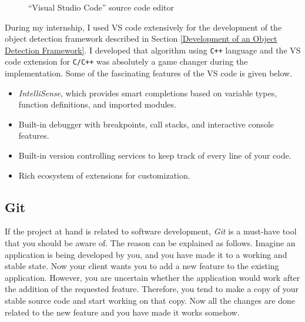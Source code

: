 \documentclass[a4paper,12pt]{report}
\begin{document}
\begin{figure}[H]
	\centering
	\caption{``Visual Studio Code'' source code editor}
	\label{fig:vscode}
\end{figure}

During my internship, I used VS code extensively for the development of the object detection framework described in Section \ref{Development of an Object Detection Framework}. I developed that algorithm using {\tt C++} language and the VS code extension for {\tt C/C++} was absolutely a game changer during the implementation. Some of the fascinating features of the VS code is given below\cite{vscode}.

\begin{itemize}
	\item \textit{IntelliSense}, which provides smart completions based on variable types, function definitions, and imported modules.
	
	\item Built-in debugger with breakpoints, call stacks, and interactive console features.
	
	\item Built-in version controlling services to keep track of every line of your code.
	
	\item Rich ecosystem of extensions for customization.
\end{itemize}



\subsection{Git}

If the project at hand is related to software development, \textit{Git} is a must-have tool that you should be aware of. The reason can be explained as follows. Imagine an application is being developed by you, and you have made it to a working and stable state. Now your client wants you to add a new feature to the existing application. However, you are uncertain whether the application would work after the addition of the requested feature. Therefore, you tend to make a copy of your stable source code and start working on that copy. Now all the changes are done related to the new feature and you have made it works somehow.\\
\end{document}
